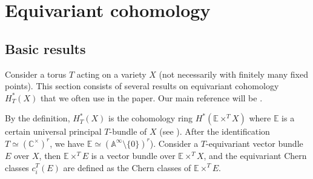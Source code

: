 \documentclass[12pt]{amsart}
\begin{document}
	




















 
	

 





\section{Equivariant cohomology}\label{sec_equiv}
\subsection{Basic results} \label{basic eqcoh}
Consider a torus $T$ acting on a variety $X$ (not necessarily with finitely many fixed points). This section consists of several results on equivariant cohomology $H_{T}^*(X)$ that we often use in the paper. Our main reference will be \cite{Anderson2023EquivariantCI}.


By the definition, $H_{T}^*(X)$ is  the cohomology ring $H^*(\mathbb{E}\times^T X)$ where $\mathbb{E}$ is a certain universal principal $T$-bundle of $X$ (see \cite{Anderson2023EquivariantCI}). After the identification $T \simeq (\mathbb{C}^\times)^r$, we have $\mathbb{E} \simeq (\mathbb{A}^\infty \setminus \{0\})^r$). Consider a $T$-equivariant vector bundle $E$ over $X$, then $\mathbb{E}\times^T E$ is a vector bundle over $\mathbb{E}\times^T X$, and the equivariant Chern classes $c_i^{T}(E)$ are defined as the Chern classes of $\mathbb{E}\times^T E$.
\end{document}
